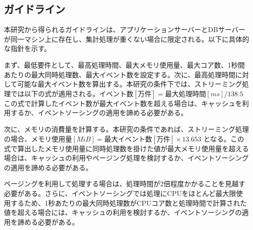 \documentclass[../../main]{subfiles}
\begin{document}
    \subsection{ガイドライン}\label{subsec:consideration-guideline}

    本研究から得られるガイドラインは、アプリケーションサーバーとDBサーバーが同一マシン上に存在し、集計処理が重くない場合に限定される。以下に具体的な指針を示す。

    まず、最低要件として、最高処理時間、最大メモリ使用量、最大コア数、1秒間あたりの最大同時処理数、最大イベント数を設定する。次に、最高処理時間に対して可能な最大イベント数を算出する。本研究の条件下では、ストリーミング処理では以下の式が適用される。$ イベント数[万件] = 最大処理時間[ms] / 138.5 $ この式で計算したイベント数が最大イベント数を超える場合は、キャッシュを利用するか、イベントソーシングの適用を諦める必要がある。

    次に、メモリの消費量を計算する。本研究の条件であれば、ストリーミング処理の場合、$ メモリ使用量[MiB] = 最大イベント数[万件] \times 13.653 $ となる。この式で算出したメモリ使用量に同時処理数を掛けた値が最大メモリ使用量を超える場合は、キャッシュの利用やページング処理を検討するか、イベントソーシングの適用を諦める必要がある。

    ページングを利用して処理する場合は、処理時間が2倍程度かかることを見越す必要がある。さらに、イベントソーシングでは処理にCPUをほとんど最大限使用するため、1秒あたりの最大同時処理数がCPUコア数と処理時間で計算された値を超える場合には、キャッシュの利用を検討するか、イベントソーシングの適用を諦める必要がある。

    \clearpage
\end{document}
